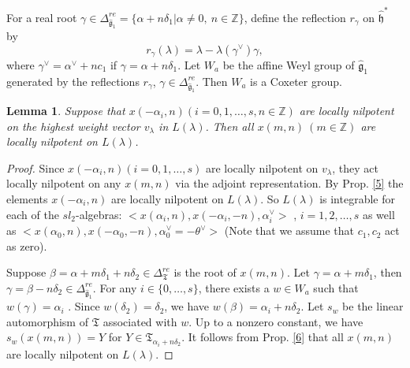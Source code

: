 \documentclass[11pt]{amsproc}
\newtheorem{lemma}[theorem]{Lemma}
\theoremstyle{definition}
\theoremstyle{remark}
\numberwithin{equation}{section} \errorcontextlines=0
\begin{document}
For a real root $\gamma\in
\Delta_{\hat{\mathfrak
g}_1}^{re}=\{\alpha+n\delta_1|\alpha\neq0,~n\in\mathbb{Z}\}$,
define the reflection $r_{\gamma}$ on $\hat{\mathfrak h}^{*}$ by
$$r_\gamma(\lambda)=\lambda-\lambda(\gamma^{\vee})\gamma,$$ where
$\gamma^{\vee}=\alpha^{\vee}+nc_1$ if
$\gamma=\alpha+n\delta_1$. Let $W_{a}$ be the affine Weyl group of
$\hat{\mathfrak g}_1$ generated by the reflections
$r_\gamma$, $\gamma\in\Delta_{\hat{\mathfrak
g}_1}^{re}$. Then $W_{a}$ is a Coxeter group.

\begin{lemma}\label{7}
Suppose that $x(-\alpha_i,n)(i=0,1,\ldots,s, n\in\mathbb{Z})$ are
locally nilpotent on the highest weight vector
$v_{\lambda}$ in $L(\lambda)$. Then all $x(m,n)~(m\in\mathbb{Z})$
are locally nilpotent on $L(\lambda)$.
\end{lemma}

\begin{proof}
Since $x(-\alpha_i,n)(i=0,1,\ldots,s)$ are locally nilpotent on $v_{\lambda}$, they act locally nilpotent on any
$x(m,n)$ via the adjoint representation. By Prop. \ref{5} the
elements $x(-\alpha_i,n)$ are locally nilpotent on $L(\lambda)$. So
$L(\lambda)$ is integrable for each of the $sl_2$-algebras:
$<x(\alpha_i,n), x(-\alpha_i,-n),\alpha_i^{\vee}>$ ,
$i=1,2,\ldots,s$ as well as
$<x(\alpha_0,n),x(-\alpha_0,-n),\alpha_{0}^{\vee}=-\theta^{\vee}>$
(Note that we assume that $c_1,c_2$ act as zero).

Suppose $\beta=\alpha+m\delta_1+n\delta_2\in
\Delta_{\mathfrak T}^{re}$ is the root of $x(m,n)$. Let $\gamma=\alpha+m\delta_1$, then
$\gamma=\beta-n\delta_2\in \Delta_{\hat{\mathfrak
g}_1}^{re}$. For any $i\in\{0, \ldots, s\}$, there exists a $w\in
W_a$ such that $w(\gamma)=\alpha_i$ \cite{VG}. Since
$w(\delta_2)=\delta_2$, we have $w(\beta)=\alpha_{i}+n\delta_2$. Let
$s_w$ be the linear automorphism of $\mathfrak T$ associated with
$w$. Up to a nonzero constant{\color{blue},} we have $s_w(x(m,n))=Y$
for $Y\in \mathfrak T_{\alpha_i+n\delta_2}$. It follows from Prop.
\ref{6} that all $x(m,n)$ are locally nilpotent on $L(\lambda)$.
\end{proof}
\end{document}
